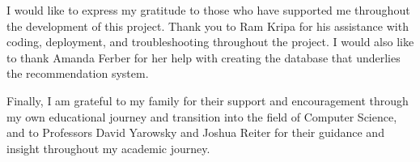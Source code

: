 

I would like to express my gratitude to those who have supported me throughout the development of this project. Thank you to Ram Kripa for his assistance with coding, deployment, and troubleshooting throughout the project. I would also like to thank Amanda Ferber for her help with creating the database that underlies the recommendation system. 

Finally, I am grateful to my family for their support and encouragement through my own educational journey and transition into the field of Computer Science, and to Professors David Yarowsky and Joshua Reiter for their guidance and insight throughout my academic journey.